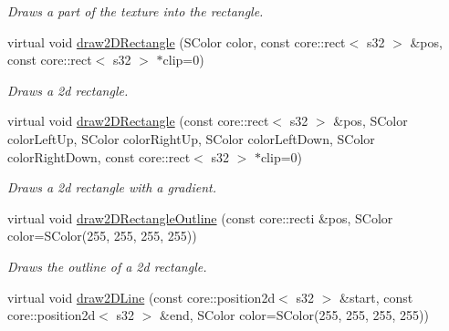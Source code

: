 \begin{DoxyCompactItemize}
\begin{DoxyCompactList}\small\item\em Draws a part of the texture into the rectangle. \end{DoxyCompactList}\item 
virtual void \hyperlink{classirr_1_1video_1_1_c_null_driver_a1d559d7a620882b729532c44f8aa0318}{draw2\-D\-Rectangle} (S\-Color color, const core\-::rect$<$ s32 $>$ \&pos, const core\-::rect$<$ s32 $>$ $\ast$clip=0)
\begin{DoxyCompactList}\small\item\em Draws a 2d rectangle. \end{DoxyCompactList}\item 
\hypertarget{classirr_1_1video_1_1_c_null_driver_a65c0b9f73aa4a9083f387baddb6b4b10}{virtual void \hyperlink{classirr_1_1video_1_1_c_null_driver_a65c0b9f73aa4a9083f387baddb6b4b10}{draw2\-D\-Rectangle} (const core\-::rect$<$ s32 $>$ \&pos, S\-Color color\-Left\-Up, S\-Color color\-Right\-Up, S\-Color color\-Left\-Down, S\-Color color\-Right\-Down, const core\-::rect$<$ s32 $>$ $\ast$clip=0)}\label{classirr_1_1video_1_1_c_null_driver_a65c0b9f73aa4a9083f387baddb6b4b10}

\begin{DoxyCompactList}\small\item\em Draws a 2d rectangle with a gradient. \end{DoxyCompactList}\item 
\hypertarget{classirr_1_1video_1_1_c_null_driver_ad42d15fef130c73047dc997d3c59de64}{virtual void \hyperlink{classirr_1_1video_1_1_c_null_driver_ad42d15fef130c73047dc997d3c59de64}{draw2\-D\-Rectangle\-Outline} (const core\-::recti \&pos, S\-Color color=S\-Color(255, 255, 255, 255))}\label{classirr_1_1video_1_1_c_null_driver_ad42d15fef130c73047dc997d3c59de64}

\begin{DoxyCompactList}\small\item\em Draws the outline of a 2d rectangle. \end{DoxyCompactList}\item 
\hypertarget{classirr_1_1video_1_1_c_null_driver_af374a57ca568d63cf0356edb402cfac3}{virtual void \hyperlink{classirr_1_1video_1_1_c_null_driver_af374a57ca568d63cf0356edb402cfac3}{draw2\-D\-Line} (const core\-::position2d$<$ s32 $>$ \&start, const core\-::position2d$<$ s32 $>$ \&end, S\-Color color=S\-Color(255, 255, 255, 255))}\label{classirr_1_1video_1_1_c_null_driver_af374a57ca568d63cf0356edb402cfac3}


\end{DoxyCompactItemize}
